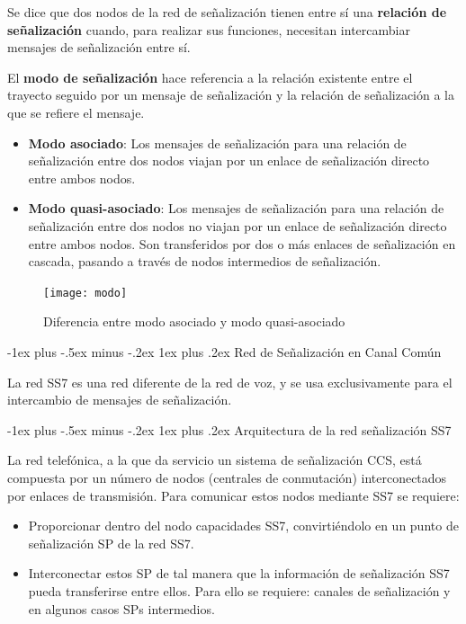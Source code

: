 \documentclass[10pt,portrait, twocolumn]{article}
\makeatletter
\renewcommand{\subsubsection}{\@startsection{subsubsection}{3}{0mm}%
                                {-1ex plus -.5ex minus -.2ex}%
                                {1ex plus .2ex}%
                                {\normalfont\small\bfseries}}
\makeatother
\begin{document}
	\quad Se dice que dos nodos de la red de señalización tienen entre sí una \textbf{relación de señalización} cuando, para realizar sus funciones, necesitan intercambiar mensajes de señalización entre sí.
	
	\quad El \textbf{modo de señalización} hace referencia a la relación existente entre el trayecto seguido por un mensaje de señalización y la relación de señalización a la que se refiere el mensaje.
	
		\begin{itemize}
		\item \textbf{Modo asociado}: Los mensajes de señalización para una relación de señalización entre dos nodos viajan por un enlace de señalización directo entre ambos nodos.
		\item \textbf{Modo quasi-asociado}: Los mensajes de señalización para una relación de señalización entre dos nodos no viajan por un enlace de señalización directo entre ambos nodos. Son transferidos por dos o más enlaces de señalización en cascada, pasando a través de nodos intermedios de señalización.
		\end{itemize}

\begin{figure}[h]
	\centering
     \texttt{[image: modo]}
      \caption{Diferencia entre modo asociado y modo quasi-asociado}
      \label{fig:modo}
\end{figure}

\subsubsection{Red de Señalización en Canal Común}

La red SS7 es una red diferente de la red de voz, y se usa exclusivamente para el intercambio de mensajes de señalización.

\subsubsection{Arquitectura de la red señalización SS7}

La red telefónica, a la que da servicio un sistema de señalización CCS, está compuesta por un número de nodos (centrales de conmutación) interconectados por enlaces de transmisión. Para comunicar estos nodos mediante SS7 se requiere:

	\begin{itemize}
	\item Proporcionar dentro del nodo capacidades SS7, convirtiéndolo en un punto de señalización SP de la red SS7.
	\item Interconectar estos SP de tal manera que la información de señalización SS7 pueda transferirse entre ellos. Para ello se requiere: canales de señalización y en algunos casos SPs intermedios.
	\end{itemize}
	
\end{document}
